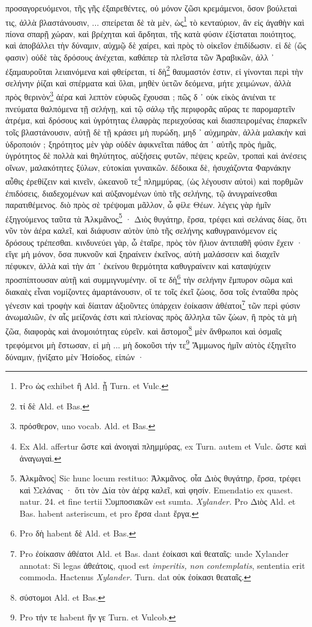 \documentclass[a4paper, 11pt, oneside, polutonikogreek, german]{article}
\begin{document}
προσαγορευόμενοι, τῆς γῆς ἐξαιρεθέντες, οὐ μόνον ζῶσι κρεμάμενοι, ὅσον βούλεταὶ τις, ἀλλὰ βλαστάνουσιν, ... σπείρεται δὲ τὰ μὲν, ὡς\footnote{Pro ὡς exhibet ἢ Ald. ᾗ Turn. et Vulc.} τὸ κενταύριον, ἂν εἰς ἀγαθὴν καὶ πίονα σπαρῇ χώραν, καὶ βρέχηται καὶ ἄρδηται, τῆς κατὰ φύσιν ἐξίσταται ποιότητος, καὶ ἀποβάλλει τὴν δύναμιν, αὐχμῷ δὲ χαίρει, καὶ πρὸς τὸ οἰκεῖον ἐπιδίδωσιν. εἰ δὲ (ὥς φασιν) οὐδὲ τὰς δρόσους ἀνέχεται, καθάπερ τὰ πλεῖστα τῶν Ἀραβικῶν, ἀλλ ᾽ ἐξαμαυροῦται λειαινόμενα καὶ φθείρεται, τί δὴ\footnote{τί δὲ Ald. et Bas.} θαυμαστόν ἐστιν, εἰ γίνονται περὶ τὴν σελήνην ῥίζαι καὶ σπέρματα καὶ ὕλαι, μηθὲν ὑετῶν δεόμενα, μήτε χειμώνων, ἀλλὰ πρὸς θερινὸν\footnote{πρόσθερον, uno vocab. Ald. et Bas.} ἀέρα καὶ λεπτὸν εὐφυῶς ἔχουσαι ; πῶς δ ᾽ οὐκ εἰκὸς ἀνιέναι τε πνεύματα θαλπόμενα τῇ σελήνῃ, καὶ τῷ σάλῳ τῆς περιφορᾶς αὔρας τε παρομαρτεῖν ἀτρέμα, καὶ δρόσους καὶ ὑγρότητας ἐλαφρὰς περιεχούσας καὶ διασπειρομένας ἐπαρκεῖν τοῖς βλαστάνουσιν, αὐτῇ δὲ τῇ κράσει μὴ πυρώδη, μηδ ᾽ αὐχμηρὰν, ἀλλὰ μαλακὴν καὶ ὑδροποιόν ; ξηρότητος μὲν γὰρ οὐδὲν ἀφικνεῖται πάθος ἀπ ᾽ αὐτῆς πρὸς ἡμᾶς, ὑγρότητος δὲ πολλὰ καὶ θηλύτητος, αὐξήσεις φυτῶν, πέψεις κρεῶν, τροπαὶ καὶ ἀνέσεις οἴνων, μαλακότητες ξύλων, εὐτοκίαι γυναικῶν. δέδοικα δὲ, ἡσυχάζοντα Φαρνάκην αὖθις ἐρεθίζειν καὶ κινεῖν, ὠκεανοῦ τε\footnote{Ex Ald. affertur ὥστε καὶ ἀνοιγαὶ πλημμύρας, ex Turn. autem et Vulc. ὥστε καὶ ἀναγωγαὶ.} πλημμύρας, (ὡς λέγουσιν αὐτοὶ) καὶ πορθμῶν ἐπιδόσεις, διαδεχομένων καὶ αὐξανομένων ὑπὸ τῆς σελήνης, τῷ ἀνυγραίνεσθαι παρατιθέμενος. διὸ πρὸς σὲ τρέψομαι μᾶλλον, ὦ φίλε Θέων. λέγεις γὰρ ἡμῖν ἐξηγούμενος ταῦτα τὰ Ἀλκμᾶνος\footnote{Ἀλκμᾶνος] Sic hunc locum restituo: Ἀλκμᾶνος. οἷα Διὸς θυγάτηρ, ἔρσα, τρέφει καὶ Σελάνας · ὅτι τὸν Δία τὸν ἀέρᾳ καλεῖ, καὶ φησίν. Emendatio ex quaest. natur. 24. et fine tertii Συμποσιακῶν est sumta. \emph{Xylander.} Pro Διὸς Ald. et Bas. habent asteriscum, et pro ἔρσα dant ἔργα.} · Διὸς θυγάτηρ, ἔρσα, τρέφει καὶ σελάνας δίας, ὅτι νῦν τὸν ἀέρα καλεῖ, καὶ διάφυσιν αὐτὸν ὑπὸ τῆς σελήνης καθυγραινόμενον εἰς δρόσους τρέπεσθαι. κινδυνεύει γὰρ, ὦ ἑταῖρε, πρὸς τὸν ἥλιον ἀντιπαθῆ φύσιν ἔχειν · εἴγε μὴ μόνον, ὅσα πυκνοῦν καὶ ξηραίνειν ἐκεῖνος, αὐτὴ μαλάσσειν καὶ διαχεῖν πέφυκεν, ἀλλὰ καὶ τὴν ἀπ ᾽ ἐκείνου θερμότητα καθυγραίνειν καὶ καταψύχειν προσπίπτουσαν αὐτῇ καὶ συμμιγνυμένην. οἵ τε δὴ\footnote{Pro δὴ habent δὲ Ald. et Bas.} τὴν σελήνην ἔμπυρον σῶμα καὶ διακαὲς εἶναι νομίζοντες ἁμαρτάνουσιν, οἵ τε τοῖς ἐκεῖ ζώοις, ὅσα τοῖς ἐνταῦθα πρὸς γένεσιν καὶ τροφὴν καὶ δίαιταν ἀξιοῦντες ὑπάρχειν ἐοίκασιν ἀθέατοι\footnote{Pro ἐοίκασιν ἀθέατοι Ald. et Bas. dant ἐοίκασι καὶ θεαταῖς: unde Xylander annotat: Si legas ἀθεάτοις, quod est \emph{imperitis, non contemplatis}, sententia erit commoda. Hactenus \emph{Xylander.} Turn. dat οὐκ ἐοίκασι θεαταῖς.} τῶν περὶ φύσιν ἀνωμαλιῶν, ἐν αἷς μείζονάς ἐστι καὶ πλείονας πρὸς ἄλληλα τῶν ζώων, ἢ πρὸς τὰ μὴ ζῶα, διαφορὰς καὶ ἀνομοιότητας εὑρεῖν. καὶ ἄστομοι\footnote{σύστομοι Ald. et Bas.} μὲν ἄνθρωποι καὶ ὀσμαῖς τρεφόμενοι μὴ ἔστωσαν, εἰ μὴ ... μὴ δοκοῦσι τήν τε\footnote{Pro τήν τε habent ἥν γε Turn. et Vulcob.} Ἄμμωνος ἡμῖν αὐτὸς ἐξηγεῖτο δύναμιν, ᾐνίξατο μὲν Ἡσίοδος, εἰπών ·
\end{document}
